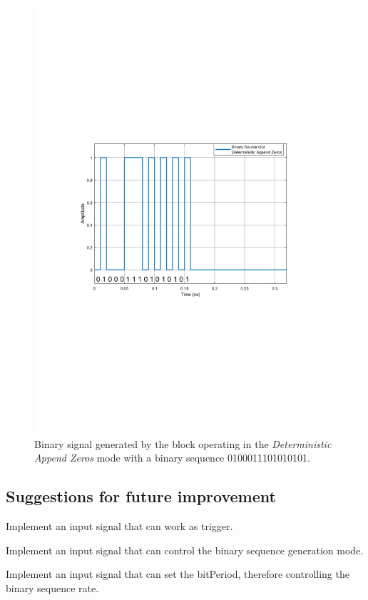 \begin{figure}[H]
	\centering
	\includegraphics[clip, trim=0.5cm 9cm 0.5cm 9cm, width=\textwidth, scale=0.7]{./lib/binary_source/figures/BinarySource_output_appendZeros.pdf}
	
	\caption{Binary signal generated by the block operating in the \textit{Deterministic Append Zeros} mode with a binary sequence 0100011101010101.}\label{DeterministicAppendZerosSource}
\end{figure}

\subsection*{Suggestions for future improvement}

\indent Implement an input signal that can work as trigger.

Implement an input signal that can control the binary sequence generation mode.

Implement an input signal that can set the bitPeriod, therefore controlling the binary sequence rate.
